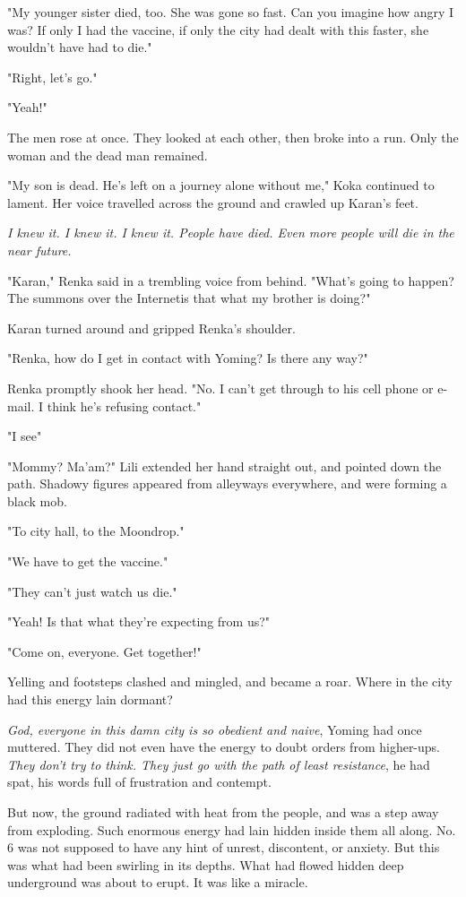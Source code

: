 "My younger sister died, too. She was gone so fast. Can you imagine how
angry I was? If only I had the vaccine, if only the city had dealt with
this faster, she wouldn't have had to die."

"Right, let's go."

"Yeah!"

The men rose at once. They looked at each other, then broke into a run.
Only the woman and the dead man remained.

"My son is dead. He's left on a journey alone without me," Koka
continued to lament. Her voice travelled across the ground and crawled
up Karan's feet.

\emph{I knew it. I knew it. I knew it. People have died. Even more people will
die in the near future.}

"Karan," Renka said in a trembling voice from behind. "What's going to
happen? The summons over the Internet\el is that what my brother is
doing?"

Karan turned around and gripped Renka's shoulder.

"Renka, how do I get in contact with Yoming? Is there any way?"

Renka promptly shook her head. "No. I can't get through to his cell
phone or e-mail. I think he's refusing contact."

"I see\el "

"Mommy? Ma'am?" Lili extended her hand straight out, and pointed down
the path. Shadowy figures appeared from alleyways everywhere, and were
forming a black mob.

"To city hall, to the Moondrop."

"We have to get the vaccine."

"They can't just watch us die."

"Yeah! Is that what they're expecting from us?"

"Come on, everyone. Get together!"

Yelling and footsteps clashed and mingled, and became a roar. Where in
the city had this energy lain dormant?

\emph{God, everyone in this damn city is so obedient and naive}, Yoming had
once muttered. They did not even have the energy to doubt orders from
higher-ups. \emph{They don't try to think. They just go with the path of least
resistance}, he had spat, his words full of frustration and contempt.

But now, the ground radiated with heat from the people, and was a step
away from exploding. Such enormous energy had lain hidden inside them
all along. No. 6 was not supposed to have any hint of unrest,
discontent, or anxiety. But this was what had been swirling in its
depths. What had flowed hidden deep underground was about to erupt. It
was like a miracle.

